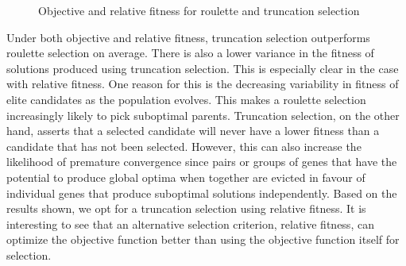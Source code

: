\begin{figure}[!h]
\centering
            \hfill
            \hfill
            \caption{Objective and relative fitness for roulette and truncation selection}
\label{fig:objective}
\end{figure}

Under both objective and relative fitness, truncation selection outperforms roulette selection on average. There is also a lower variance in the fitness of solutions produced using truncation selection. This is especially clear in the case with relative fitness. One reason for this is the decreasing variability in fitness of elite candidates as the population evolves. This makes a roulette selection increasingly likely to pick suboptimal parents. Truncation selection, on the other hand, asserts that a selected candidate will never have a lower fitness than a candidate that has not been selected. However, this can also increase the likelihood of premature convergence since pairs or groups of genes that have the potential to produce global optima when together are evicted in favour of individual genes that produce suboptimal solutions independently. Based on the results shown, we opt for a truncation selection using relative fitness. It is interesting to see that an alternative selection criterion, relative fitness, can optimize the objective function better than using the objective function itself for selection.

